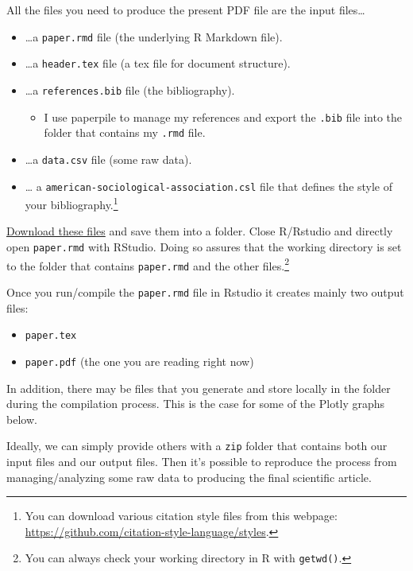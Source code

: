 \documentclass[12pt,]{article}
\providecommand{\tightlist}{%
  \setlength{\itemsep}{0pt}\setlength{\parskip}{0pt}}
\let\rmarkdownfootnote\footnote%
\def\footnote{\protect\rmarkdownfootnote}
\theoremstyle{definition}
\theoremstyle{definition}
\theoremstyle{definition}
\theoremstyle{remark}
\begin{document}
All the files you need to produce the present PDF file are the input
files\ldots{}

\begin{itemize}
\tightlist
\item
  \ldots{}a \texttt{paper.rmd} file (the underlying R Markdown file).
\item
  \ldots{}a \texttt{header.tex} file (a tex file for document
  structure).
\item
  \ldots{}a \texttt{references.bib} file (the bibliography).

  \begin{itemize}
  \tightlist
  \item
    I use paperpile to manage my references and export the \texttt{.bib}
    file into the folder that contains my \texttt{.rmd} file.
  \end{itemize}
\item
  \ldots{}a \texttt{data.csv} file (some raw data).
\item
  \ldots{} a \texttt{american-sociological-association.csl} file that
  defines the style of your bibliography.\footnote{You can download
    various citation style files from this webpage:
    \url{https://github.com/citation-style-language/styles}.}
\end{itemize}

\href{https://drive.google.com/drive/folders/1zJP3cNPrHN-gj0rcmbHQgg-XA0hqDXdd?usp=sharing}{Download
these files} and save them into a folder. Close R/Rstudio and directly
open \texttt{paper.rmd} with RStudio. Doing so assures that the working
directory is set to the folder that contains \texttt{paper.rmd} and the
other files.\footnote{You can always check your working directory in R
  with \texttt{getwd()}.}

Once you run/compile the \texttt{paper.rmd} file in Rstudio it creates
mainly two output files:

\begin{itemize}
\tightlist
\item
  \texttt{paper.tex}
\item
  \texttt{paper.pdf} (the one you are reading right now)
\end{itemize}

In addition, there may be files that you generate and store locally in
the folder during the compilation process. This is the case for some of
the Plotly graphs below.

Ideally, we can simply provide others with a \texttt{zip} folder that
contains both our input files and our output files. Then it's possible
to reproduce the process from managing/analyzing some raw data to
producing the final scientific article.
\end{document}
